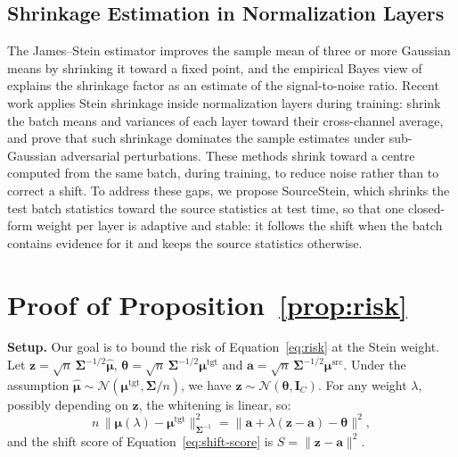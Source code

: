 \subsection{Shrinkage Estimation in Normalization Layers}
The James--Stein estimator \cite{James-Stein} improves the sample mean of three or more Gaussian means by shrinking it toward a fixed point, and the empirical Bayes view of \citet{Efron-Morris} explains the shrinkage factor as an estimate of the signal-to-noise ratio.
Recent work applies Stein shrinkage inside normalization layers during training: \citet{JS-Norm} shrink the batch means and variances of each layer toward their cross-channel average, and \citet{Stein-BN-Adv} prove that such shrinkage dominates the sample estimates under sub-Gaussian adversarial perturbations.
These methods shrink toward a centre computed from the same batch, during training, to reduce noise rather than to correct a shift.
To address these gaps, we propose SourceStein, which shrinks the test batch statistics toward the source statistics at test time, so that one closed-form weight per layer is adaptive and stable: it follows the shift when the batch contains evidence for it and keeps the source statistics otherwise.

\clearpage
\section{Proof of Proposition~\ref{prop:risk}} \label{apdx:proof}
\textbf{Setup.} Our goal is to bound the risk of Equation~\ref{eq:risk} at the Stein weight.
Let $\mathbf{z} = \sqrt{n}\,\boldsymbol{\Sigma}^{-1/2}\hat{\boldsymbol{\mu}}$, $\boldsymbol{\theta} = \sqrt{n}\,\boldsymbol{\Sigma}^{-1/2}\boldsymbol{\mu}^{\text{tgt}}$ and $\mathbf{a} = \sqrt{n}\,\boldsymbol{\Sigma}^{-1/2}\boldsymbol{\mu}^{\text{src}}$.
Under the assumption $\hat{\boldsymbol{\mu}} \sim \mathcal{N}(\boldsymbol{\mu}^{\text{tgt}}, \boldsymbol{\Sigma}/n)$, we have $\mathbf{z} \sim \mathcal{N}(\boldsymbol{\theta}, \mathbf{I}_C)$.
For any weight $\lambda$, possibly depending on $\mathbf{z}$, the whitening is linear, so:
\begin{equation*}
n\,\|\boldsymbol{\mu}(\lambda) - \boldsymbol{\mu}^{\text{tgt}}\|^2_{\boldsymbol{\Sigma}^{-1}} = \|\mathbf{a} + \lambda(\mathbf{z} - \mathbf{a}) - \boldsymbol{\theta}\|^2,
\end{equation*}
and the shift score of Equation~\ref{eq:shift-score} is $S = \|\mathbf{z} - \mathbf{a}\|^2$.

